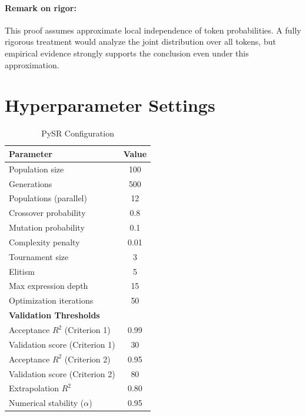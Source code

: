 \documentclass[twoside,11pt]{article}
\begin{document}
\paragraph{Remark on rigor:} This proof assumes approximate local independence of token probabilities. A fully rigorous treatment would analyze the joint distribution over all tokens, but empirical evidence strongly supports the conclusion even under this approximation.


\section{Hyperparameter Settings}
\label{app:hyperparameters}

\begin{table}[H]
\centering
\caption{PySR Configuration}
\label{tab:hyperparameters}
\begin{tabular}{@{}lc@{}}
\toprule
\textbf{Parameter} & \textbf{Value} \\
\midrule
Population size & 100 \\
Generations & 500 \\
Populations (parallel) & 12 \\
Crossover probability & 0.8 \\
Mutation probability & 0.1 \\
Complexity penalty & 0.01 \\
Tournament size & 3 \\
Elitism & 5 \\
Max expression depth & 15 \\
Optimization iterations & 50 \\
\midrule
\textbf{Validation Thresholds} & \\
\midrule
Acceptance $R^2$ (Criterion 1) & 0.99 \\
Validation score (Criterion 1) & 30 \\
Acceptance $R^2$ (Criterion 2) & 0.95 \\
Validation score (Criterion 2) & 80 \\
Extrapolation $R^2$ & 0.80 \\
Numerical stability ($\alpha$) & 0.95 \\
\bottomrule
\end{tabular}
\end{table}
\end{document}
